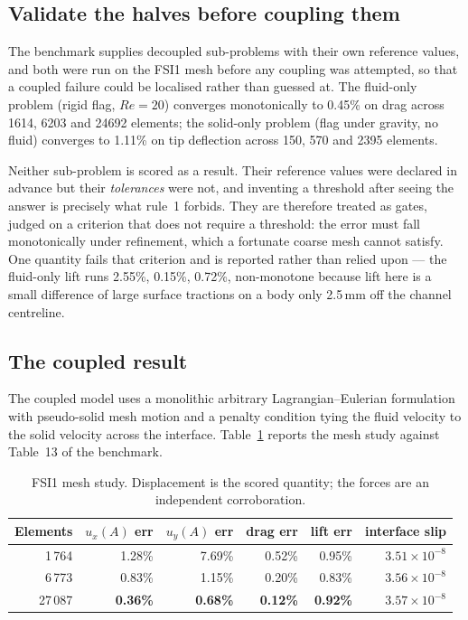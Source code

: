 \documentclass[11pt,a4paper]{article}
\begin{document}
\subsection{Validate the halves before coupling them}
The benchmark supplies decoupled sub-problems with their own reference values,
and both were run on the FSI1 mesh before any coupling was attempted, so that a
coupled failure could be localised rather than guessed at. The fluid-only
problem (rigid flag, $Re=20$) converges monotonically to 0.45\% on drag across
1614, 6203 and 24692 elements; the solid-only problem (flag under gravity, no
fluid) converges to 1.11\% on tip deflection across 150, 570 and 2395 elements.

Neither sub-problem is scored as a result. Their reference values were declared
in advance but their \emph{tolerances} were not, and inventing a threshold after
seeing the answer is precisely what rule~1 forbids. They are therefore treated as
gates, judged on a criterion that does not require a threshold: the error must
fall monotonically under refinement, which a fortunate coarse mesh cannot
satisfy. One quantity fails that criterion and is reported rather than relied
upon --- the fluid-only lift runs 2.55\%, 0.15\%, 0.72\%, non-monotone because
lift here is a small difference of large surface tractions on a body only
2.5\,mm off the channel centreline.

\subsection{The coupled result}
The coupled model uses a monolithic arbitrary Lagrangian--Eulerian formulation
with pseudo-solid mesh motion and a penalty condition tying the fluid velocity to
the solid velocity across the interface. Table~\ref{tab:fsi} reports the mesh
study against Table~13 of the benchmark.

\begin{table}[h]\centering\footnotesize
\caption{FSI1 mesh study. Displacement is the scored quantity; the forces are an
independent corroboration.\label{tab:fsi}}
\begin{tabular}{@{}rrrrrr@{}}
\toprule
Elements & $u_x(A)$ err & $u_y(A)$ err & drag err & lift err & interface slip\\
\midrule
1\,764  & 1.28\% & 7.69\% & 0.52\% & 0.95\% & $3.51\times10^{-8}$\\
6\,773  & 0.83\% & 1.15\% & 0.20\% & 0.83\% & $3.56\times10^{-8}$\\
27\,087 & \textbf{0.36\%} & \textbf{0.68\%} & \textbf{0.12\%} & \textbf{0.92\%} & $3.57\times10^{-8}$\\
\bottomrule
\end{tabular}
\end{table}
\end{document}
